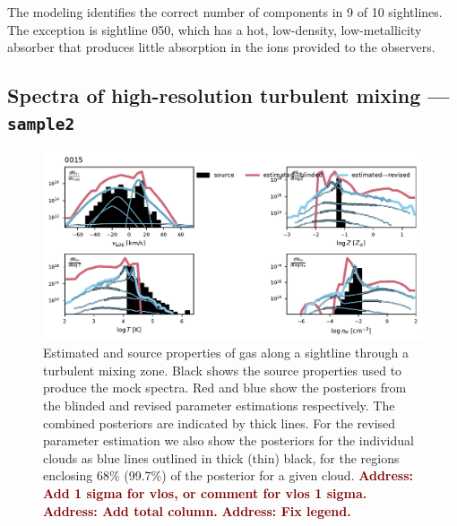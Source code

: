 \documentclass[fleqn,usenatbib]{mnras}
\newcommand{\todo}[1]{\textcolor{Maroon}{\textbf{Address: #1}}}
\begin{document}
The modeling identifies the correct number of components in 9 of 10 sightlines.
The exception is sightline 050, which has a hot, low-density, low-metallicity absorber that produces little absorption in the ions provided to the observers.

\subsection{Spectra of high-resolution turbulent mixing --- \texttt{sample2}}
\label{s: results -- sample2}

\begin{figure}
    \centering
    \includegraphics[width=\textwidth]{figures/sample2/high-z/sightline_0015.pdf}
    \caption{
    Estimated and source properties of gas along a sightline through a turbulent mixing zone.
    Black shows the source properties used to produce the mock spectra.
    Red and blue show the posteriors from the blinded and revised parameter estimations respectively. 
    The combined posteriors are indicated by thick lines.
    For the revised parameter estimation we also show the posteriors for the individual clouds as blue lines outlined in thick (thin) black, for the regions enclosing 68\% (99.7\%) of the posterior for a given cloud.
    \todo{Add 1 sigma for vlos, or comment for vlos 1 sigma.}
    \todo{Add total column.}
    \todo{Fix legend.}
    }
    \label{f: sample2 15}
\end{figure}
\end{document}
